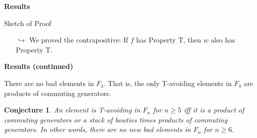 \documentclass[9pt,handout]{beamer}
\newtheorem{conjecture}{Conjecture}
\newcommand{\<}{\langle}
\renewcommand{\>}{\rangle}
\begin{document}
\begin{frame}{\textbf{Results}}
\begin{block}{Sketch of Proof}
\begin{itemize}
\begin{itemize}
\item[{\LARGE $\hookrightarrow$}] We proved the contrapositive: If $f$ has Property T, then $w$ also has Property T.
\end{itemize}

\end{itemize}

\end{block}

\end{frame}



\begin{frame}{\textbf{Results (continued)}}\pause

\begin{corollary}
There are no bad elements in $F_{4}$.  That is, the only T-avoiding elements in $F_{4}$ are products of commuting generators.
\end{corollary}

\pause

\begin{conjecture}
An element is T-avoiding in $F_{n}$ for $n\geq 5$ iff it is a product of commuting generators or a stack of bowties times products of commuting generators.  In other words, there are no new bad elements in $F_{n}$ for $n\geq 6$.
\end{conjecture}

\vspace{1em}
\pause

\begin{center}
{\Huge \color{brown}{THANK YOU!}}
\end{center}

\end{frame}

\end{document}
